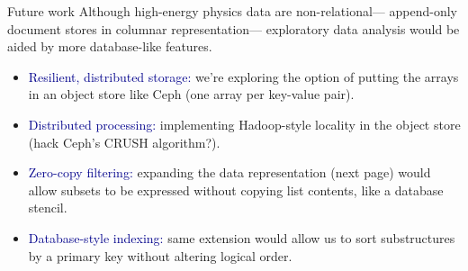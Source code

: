 \documentclass[aspectratio=169]{beamer}
\begin{document}
\begin{frame}{Future work}
\vspace{0.35 cm}
\large
Although high-energy physics data are non-relational--- append-only document stores in columnar representation--- exploratory data analysis would be aided by more database-like features.

\begin{itemize}\setlength{\itemsep}{0.2 cm}
\item<2-> \textcolor{darkblue}{Resilient, distributed storage:} we're exploring the option of putting the arrays in an object store like Ceph (one array per key-value pair).
\item<3-> \textcolor{darkblue}{Distributed processing:} implementing Hadoop-style locality in the object store (hack Ceph's CRUSH algorithm?).
\item<4-> \textcolor{darkblue}{Zero-copy filtering:} expanding the data representation (next page) would allow subsets to be expressed without copying list contents, like a database stencil.
\item<5-> \textcolor{darkblue}{Database-style indexing:} same extension would allow us to sort substructures by a primary key without altering logical order.
\end{itemize}
\end{frame}
\end{document}
